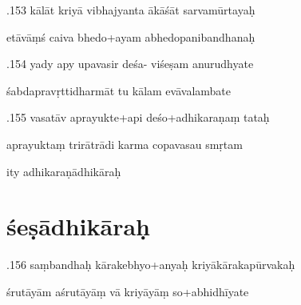 \documentclass[article,12pt,a4paper]{memoir}%
\newcounter{parCount}
\begin{document}
	  
	  \pstart {}.153 kālāt kriyā vibhajyanta ākāśāt sarvamūrtayaḥ 
	{}
	\pend%
      

	  
	  \pstart \leavevmode%
	etāvāṃś caiva bhedo+ayam abhedopanibandhanaḥ 
	{}
	\pend%
      

	  
	  \pstart {}.154 yady apy upavasir deśa- viśeṣam anurudhyate 
	{}
	\pend%
      

	  
	  \pstart \leavevmode%
	śabdapravṛttidharmāt tu kālam evāvalambate 
	{}
	\pend%
      

	  
	  \pstart {}.155 vasatāv aprayukte+api deśo+adhikaraṇaṃ tataḥ 
	{}
	\pend%
      

	  
	  \pstart \leavevmode%
	aprayuktaṃ trirātrādi karma copavasau smṛtam 
	{}
	\pend%
      

	  
	  \pstart \leavevmode%
	ity adhikaraṇādhikāraḥ
	{}
	\pend%
      
	  
	
\chapter[{śeṣādhikāraḥ}][{śeṣādhikāraḥ}]{ śeṣādhikāraḥ}

	  
	  \pstart {}.156 saṃbandhaḥ kārakebhyo+anyaḥ   kriyākārakapūrvakaḥ 
	{}
	\pend%
      

	  
	  \pstart \leavevmode%
	śrutāyām aśrutāyāṃ vā kriyāyāṃ so+abhidhīyate 
	{}
	\pend%
      
\end{document}
